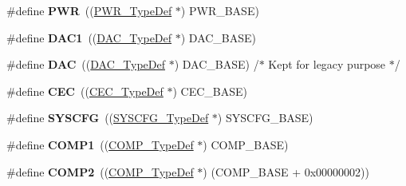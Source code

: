 \begin{DoxyCompactItemize}
\item 
\mbox{\label{group___peripheral__declaration_ga04651c526497822a859942b928e57f8e}} 
\#define {\bfseries P\+WR}~((\hyperlink{struct_p_w_r___type_def}{P\+W\+R\+\_\+\+Type\+Def} $\ast$) P\+W\+R\+\_\+\+B\+A\+SE)
\item 
\mbox{\label{group___peripheral__declaration_gaffb5ff8779fa698f3c7165a617d56e4f}} 
\#define {\bfseries D\+A\+C1}~((\hyperlink{struct_d_a_c___type_def}{D\+A\+C\+\_\+\+Type\+Def} $\ast$) D\+A\+C\+\_\+\+B\+A\+SE)
\item 
\mbox{\label{group___peripheral__declaration_ga4aa2a4ab86ce00c23035e5cee2e7fc7e}} 
\#define {\bfseries D\+AC}~((\hyperlink{struct_d_a_c___type_def}{D\+A\+C\+\_\+\+Type\+Def} $\ast$) D\+A\+C\+\_\+\+B\+A\+SE) /$\ast$ Kept for legacy purpose $\ast$/
\item 
\mbox{\label{group___peripheral__declaration_ga7d03f4d873d59ff8bc76b6c9b576f3e3}} 
\#define {\bfseries C\+EC}~((\hyperlink{struct_c_e_c___type_def}{C\+E\+C\+\_\+\+Type\+Def} $\ast$) C\+E\+C\+\_\+\+B\+A\+SE)
\item 
\mbox{\label{group___peripheral__declaration_ga3c833fe1c486cb62250ccbca32899cb8}} 
\#define {\bfseries S\+Y\+S\+C\+FG}~((\hyperlink{struct_s_y_s_c_f_g___type_def}{S\+Y\+S\+C\+F\+G\+\_\+\+Type\+Def} $\ast$) S\+Y\+S\+C\+F\+G\+\_\+\+B\+A\+SE)
\item 
\mbox{\label{group___peripheral__declaration_gaf5713f83009027d48805b049d55bb01b}} 
\#define {\bfseries C\+O\+M\+P1}~((\hyperlink{struct_c_o_m_p___type_def}{C\+O\+M\+P\+\_\+\+Type\+Def} $\ast$) C\+O\+M\+P\+\_\+\+B\+A\+SE)
\item 
\mbox{\label{group___peripheral__declaration_ga6985fa7e9bb3c2edf15b29b7af210a2b}} 
\#define {\bfseries C\+O\+M\+P2}~((\hyperlink{struct_c_o_m_p___type_def}{C\+O\+M\+P\+\_\+\+Type\+Def} $\ast$) (C\+O\+M\+P\+\_\+\+B\+A\+SE + 0x00000002))
\item 
\mbox{\label{group___peripheral__declaration_ga7c0dbc759386dc94597d1ab7b798e75f}} 

\end{DoxyCompactItemize}
